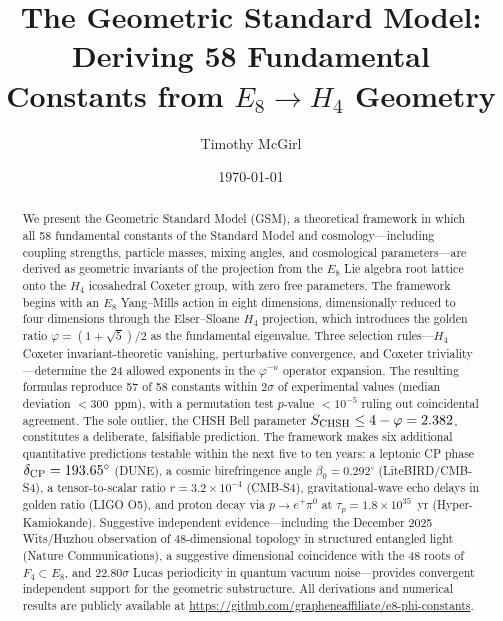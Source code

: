 \documentclass[aps,prd,twocolumn,superscriptaddress,nofootinbib,showpacs]{revtex4-2}
\begin{document}
\title{The Geometric Standard Model:\\
Deriving 58 Fundamental Constants from $E_8 \to H_4$ Geometry}

\author{Timothy McGirl}

\date{\today}


\begin{abstract}
We present the Geometric Standard Model (GSM), a theoretical framework
in which all 58 fundamental constants of the Standard Model and
cosmology---including coupling strengths, particle masses, mixing
angles, and cosmological parameters---are derived as geometric
invariants of the projection from the $E_8$ Lie algebra root lattice
onto the $H_4$ icosahedral Coxeter group, with zero free parameters.
The framework begins with an $E_8$ Yang--Mills action in eight
dimensions, dimensionally reduced to four dimensions through the
Elser--Sloane $H_4$ projection, which introduces the golden ratio
$\varphi = (1+\sqrt{5})/2$ as the fundamental eigenvalue.  Three
selection rules---$H_4$ Coxeter invariant-theoretic vanishing,
perturbative convergence, and Coxeter triviality---determine the 24
allowed exponents in the $\varphi^{-n}$ operator expansion.  The
resulting formulas reproduce 57 of 58 constants within $2\sigma$ of
experimental values (median deviation ${<}300$~ppm), with a permutation
test $p$-value ${<}10^{-5}$ ruling out coincidental agreement.  The
sole outlier, the CHSH Bell parameter $S_{\rm CHSH} \leq 4 - \varphi
= 2.382$, constitutes a deliberate, falsifiable prediction.  The
framework makes six additional quantitative predictions testable within
the next five to ten years: a leptonic CP phase $\delta_{\rm CP} =
193.65^\circ$ (DUNE), a cosmic birefringence angle $\beta_0 =
0.292^\circ$ (LiteBIRD/CMB-S4), a tensor-to-scalar ratio $r = 3.2
\times 10^{-4}$ (CMB-S4), gravitational-wave echo delays in golden
ratio (LIGO O5), and proton decay via $p \to e^+\pi^0$ at $\tau_p = 1.8 \times
10^{35}$~yr (Hyper-Kamiokande).  Suggestive independent evidence---including the
December 2025 Wits/Huzhou observation of 48-dimensional topology
in structured entangled light (Nature Communications), a suggestive
dimensional coincidence with the 48 roots of $F_4 \subset E_8$, and
22.80$\sigma$ Lucas periodicity in quantum vacuum noise---provides
convergent independent support for the geometric substructure.  All derivations and numerical results are
publicly available at
\url{https://github.com/grapheneaffiliate/e8-phi-constants}.
\end{abstract}
\end{document}
